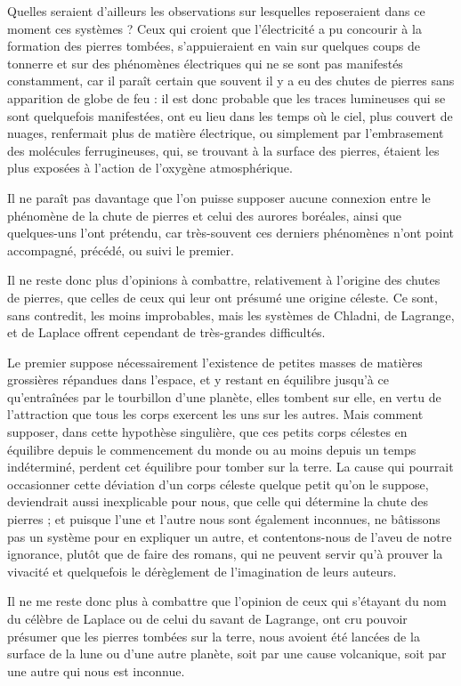 \documentclass[a4paper, 12pt, oneside, french]{article}
\begin{document}
Quelles seraient d'ailleurs les observations sur lesquelles reposeraient dans ce moment ces systèmes ? Ceux qui croient que l'électricité a pu concourir à la formation des pierres tombées, s'appuieraient en vain sur quelques coups de tonnerre et sur des phénomènes électriques qui ne se sont pas manifestés constamment, car il paraît certain que souvent il y a eu des chutes de pierres sans apparition de globe de feu : il est donc probable que les traces lumineuses qui se sont quelquefois manifestées, ont eu lieu dans les temps où le ciel, plus couvert de nuages, renfermait plus de matière électrique, ou simplement par l'embrasement des molécules ferrugineuses, qui, se trouvant à la surface des pierres, étaient les plus exposées à l'action de l'oxygène atmosphérique.

Il ne paraît pas davantage que l'on puisse supposer aucune connexion entre le phénomène de la chute de pierres et celui des aurores boréales, ainsi que quelques-uns l'ont prétendu, car très-souvent ces derniers phénomènes n'ont point accompagné, précédé, ou suivi le premier.

Il ne reste donc plus d'opinions à combattre, relativement à l'origine des chutes de pierres, que celles de ceux qui leur ont présumé une origine céleste. Ce sont, sans contredit, les moins improbables, mais les systèmes de Chladni, de Lagrange, et de Laplace offrent cependant de très-grandes difficultés.

Le premier suppose nécessairement l'existence de petites masses de matières grossières répandues dans l'espace, et y restant en équilibre jusqu'à ce qu'entraînées par le tourbillon d'une planète, elles tombent sur elle, en vertu de l'attraction que tous les corps exercent les uns sur les autres. Mais comment supposer, dans cette hypothèse singulière, que ces petits corps célestes en équilibre depuis le commencement du monde ou au moins depuis un temps indéterminé, perdent cet équilibre pour tomber sur la terre. La cause qui pourrait occasionner cette déviation d'un corps céleste quelque petit qu'on le suppose, deviendrait aussi inexplicable pour nous, que celle qui détermine la chute des pierres ; et puisque l'une et l'autre nous sont également inconnues, ne bâtissons pas un système pour en expliquer un autre, et contentons-nous de l'aveu de notre ignorance, plutôt que de faire des romans, qui ne peuvent servir qu'à prouver la vivacité et quelquefois le dérèglement de l'imagination de leurs auteurs.

Il ne me reste donc plus à combattre que l'opinion de ceux qui s'étayant du nom du célèbre de Laplace ou de celui du savant de Lagrange, ont cru pouvoir présumer que les pierres tombées sur la terre, nous avoient été lancées de la surface de la lune ou d'une autre planète, soit par une cause volcanique, soit par une autre qui nous est inconnue.
\end{document}
